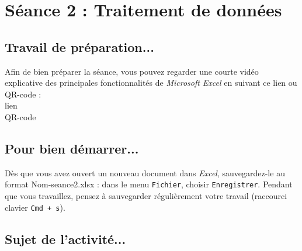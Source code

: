 \vfill








%
%
%
%


\pagebreak

\section{Séance 2 : Traitement de données}\label{ficheTableur4e2}

\subsection{Travail de préparation...}

Afin de bien préparer la séance, vous pouvez regarder une courte vidéo explicative des principales fonctionnalités de \emph{Microsoft Excel} en suivant ce lien ou QR-code :\\

lien\\
QR-code

\subsection{Pour bien démarrer...}

Dès que vous avez ouvert un nouveau document dans \emph{Excel}, sauvegardez-le au format Nom-seance2.xlsx : dans le menu \texttt{Fichier}, choisir \texttt{Enregistrer}. Pendant que vous travaillez, pensez à sauvegarder régulièrement votre travail (raccourci clavier \texttt{Cmd + s}).   



\subsection{Sujet de l'activité...}

\vspace{10pt}



